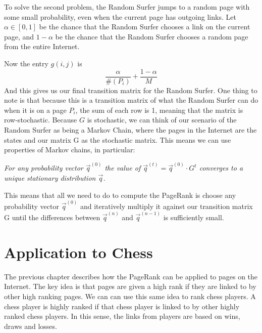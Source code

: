 \documentclass[pdftex,11pt,a4paper]{report}
\begin{document}
To solve the second problem, the Random Surfer jumps to a random page with some small
probability, even when the current page has outgoing links. Let $\alpha \in [0, 1]$
be the chance that the Random Surfer chooses a link on the current page, and $1 - \alpha$
be the chance that the Random Surfer chooses a random page from the entire Internet.


Now the entry $g(i, j)$ is $$\frac{\alpha}{\#(P_i)} + \frac{1 - \alpha}{M}$$ And this gives us our final transition matrix for the Random Surfer. One thing to note
is that because this is a transition matrix of what the Random Surfer can do
when it is on a page $P_i$, the sum of each row is 1, meaning that the matrix is row-stochastic.
Because $G$ is stochastic,
we can think of our scenario of the Random Surfer as being a Markov Chain, where the pages in the Internet
are the states and our matrix G as the stochastic matrix. This means we can use properties of Markov chains,
in particular:

\emph{
For any probability vector $\overrightarrow{q}^{(0)}$ the value of 
$\overrightarrow{q}^{(t)} = \overrightarrow{q}^{(0)} \cdot G^t$
converges to a unique stationary distribution $\overrightarrow{q}$.
}

This means that all we need to do to compute the PageRank is choose any probability vector $\overrightarrow{q}^{(0)}$ and
iteratively multiply it against our transition matrix G until the differences between
$\overrightarrow{q}^{(n)}$ and $\overrightarrow{q}^{(n - 1)}$ is sufficiently small.

\chapter{Application to Chess}

The previous chapter describes how the PageRank can be applied to pages on the Internet.
The key idea is that pages are given a high rank if they are linked to by other high ranking pages.
We can can use this same idea to rank chess players. A chess player is highly ranked if 
that chess player is linked to by other highly ranked chess players. In this sense, the links
from players are based on wins, draws and losses.
\end{document}
